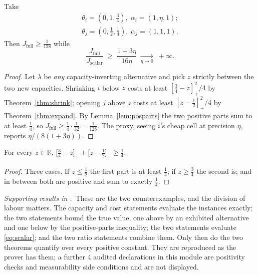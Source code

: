 \begin{theorem}
\label{thm:family2}
Take
\begin{align}
\theta_{i}=(0,1,\tfrac34),\;\alpha_{i}=(1,\eta,1);\\
\theta_{j}=(0,\tfrac12,\tfrac14),\;\alpha_{j}=(1,1,1).
\end{align}
Then $J_{\mathrm{full}}\ge\tfrac{1}{128}$ while
\begin{equation}
\frac{J_{\mathrm{full}}}{J_{\mathrm{scalar}}}
\;\geq\;\frac{1+3\eta}{16\eta}
\;\xrightarrow[\eta\to0]{}\;+\infty .
\label{eq:family2}
\end{equation}
\end{theorem}

\begin{proof}
Let $\lambda$ be \emph{any} capacity-inverting alternative and pick $z$ strictly between the
two new capacities. Shrinking $i$ below $z$ costs at least $[\tfrac34-z]_{+}^{2}/4$ by
Theorem~\ref{thm:shrink}; opening $j$ above $z$ costs at least $[z-\tfrac12]_{+}^{2}/4$ by
Theorem~\ref{thm:expand}. By Lemma~\ref{lem:posparts} the two positive parts sum to at least
$\tfrac14$, so $J_{\mathrm{full}}\ge\tfrac14\cdot\tfrac{1}{32}=\tfrac{1}{128}$. The proxy,
seeing $i$'s cheap cell at precision $\eta$, reports $\eta/(8(1+3\eta))$.
\end{proof}


\begin{lemma}
\label{lem:posparts}
For every $z\in\mathbb{R}$,
$\bigl[\tfrac34-z\bigr]_{+}+\bigl[z-\tfrac12\bigr]_{+}\ge\tfrac14$.
\end{lemma}

\begin{proof}
Three cases. If $z\le\tfrac12$ the first part is at least $\tfrac14$; if $z\ge\tfrac34$ the
second is; and in between both are positive and sum to exactly $\tfrac14$.
\end{proof}


\noindent\emph{Supporting results in .}~These are the two counterexamples, and the division of labour matters. The capacity and cost statements evaluate the instances exactly; the two  statements bound the true value, one above by an exhibited alternative and one below by the positive-parts inequality; the two  statements evaluate \eqref{eq:scalar}; and the two ratio statements combine them. Only then do the two  theorems quantify over every positive constant. They are reproduced as the prover has them; a further $4$ audited declarations in this module are positivity checks and measurability side conditions and are not displayed.

